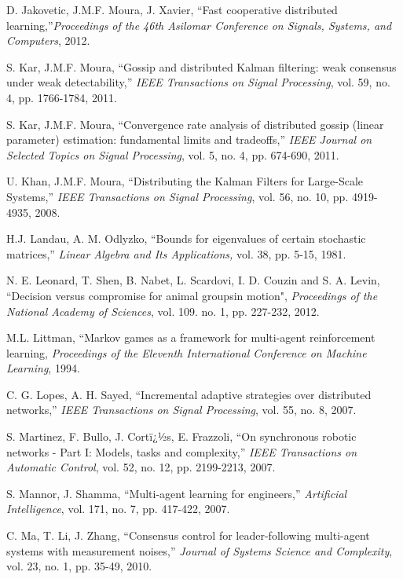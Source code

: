 \documentclass[final]{siamltex}
\begin{document}
\begin{thebibliography}{99}
 D. Jakovetic, J.M.F. Moura, J. Xavier, ``Fast cooperative distributed learning,''{\em Proceedings of the 46th Asilomar Conference on Signals, Systems, and Computers}, 2012.

 S. Kar, J.M.F. Moura, ``Gossip and distributed Kalman filtering: weak consensus under weak detectability,'' 
{\em IEEE Transactions on Signal Processing}, vol. 59, no. 4, pp. 1766-1784, 2011. 

 S. Kar, J.M.F. Moura, ``Convergence rate analysis of distributed gossip (linear parameter) estimation: fundamental limits and tradeoffs,''
{\em IEEE Journal on Selected Topics on Signal Processing}, vol. 5, no. 4, pp. 674-690, 2011.

 U. Khan, J.M.F. Moura, ``Distributing the Kalman Filters for Large-Scale Systems,'' {\em IEEE Transactions on Signal Processing}, 
vol. 56, no. 10, pp. 4919-4935,  2008.

 H.J. Landau, A. M. Odlyzko, ``Bounds for eigenvalues of certain
stochastic matrices,'' {\em Linear Algebra and Its Applications,}  vol. 38, pp. 5-15, 1981.

 N. E. Leonard, T. Shen, B. Nabet, L. Scardovi, I. D. Couzin and S. A. Levin, ``Decision versus compromise for animal groupsin motion", {\em Proceedings of the National Academy of Sciences}, vol. 109. no. 1, pp. 227-232, 2012.

 M.L. Littman, ``Markov games as a framework for multi-agent reinforcement learning, {\em Proceedings of the Eleventh International Conference on Machine Learning},  1994.

 C. G. Lopes, A. H. Sayed, ``Incremental adaptive strategies over distributed networks,'' {\em IEEE Transactions on Signal Processing}, 
vol. 55, no. 8, 2007.

 S. Martinez, F. Bullo, J. Cortï¿½s, E. Frazzoli, ``On synchronous robotic networks - Part I: Models, tasks and complexity,'' 
{\em IEEE Transactions on Automatic Control}, vol. 52, no. 12, pp. 2199-2213, 2007.

 S. Mannor, J. Shamma, ``Multi-agent learning for engineers,'' {\em Artificial Intelligence}, 
vol. 171, no. 7, pp. 417-422, 2007.

 C. Ma, T. Li, J. Zhang, ``Consensus control for leader-following multi-agent systems with measurement noises,''
{\em Journal of Systems Science and Complexity}, vol. 23, no. 1, pp. 35-49, 2010. 


\end{thebibliography}
\end{document}
